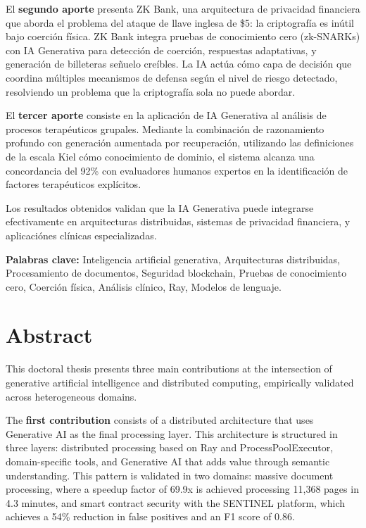 \documentclass[12pt,a4paper,twoside]{book}
\begin{document}
El \textbf{segundo aporte} presenta ZK Bank, una arquitectura de privacidad financiera que aborda el problema del ataque de llave inglesa de \$5: la criptografía es inútil bajo coerción física. ZK Bank integra pruebas de conocimiento cero (zk-SNARKs) con IA Generativa para detección de coerción, respuestas adaptativas, y generación de billeteras señuelo creíbles. La IA actúa cómo capa de decisión que coordina múltiples mecanismos de defensa según el nivel de riesgo detectado, resolviendo un problema que la criptografía sola no puede abordar.

El \textbf{tercer aporte} consiste en la aplicación de IA Generativa al análisis de procesos terapéuticos grupales. Mediante la combinación de razonamiento profundo con generación aumentada por recuperación, utilizando las definiciones de la escala Kiel cómo conocimiento de dominio, el sistema alcanza una concordancia del 92\% con evaluadores humanos expertos en la identificación de factores terapéuticos explícitos.

Los resultados obtenidos validan que la IA Generativa puede integrarse efectivamente en arquitecturas distribuidas, sistemas de privacidad financiera, y aplicaciónes clínicas especializadas.

\textbf{Palabras clave:} Inteligencia artificial generativa, Arquitecturas distribuidas, Procesamiento de documentos, Seguridad blockchain, Pruebas de conocimiento cero, Coerción física, Análisis clínico, Ray, Modelos de lenguaje.

\chapter*{Abstract}

This doctoral thesis presents three main contributions at the intersection of generative artificial intelligence and distributed computing, empirically validated across heterogeneous domains.

The \textbf{first contribution} consists of a distributed architecture that uses Generative AI as the final processing layer. This architecture is structured in three layers: distributed processing based on Ray and ProcessPoolExecutor, domain-specific tools, and Generative AI that adds value through semantic understanding. This pattern is validated in two domains: massive document processing, where a speedup factor of 69.9x is achieved processing 11,368 pages in 4.3 minutes, and smart contract security with the SENTINEL platform, which achieves a 54\% reduction in false positives and an F1 score of 0.86.
\end{document}
